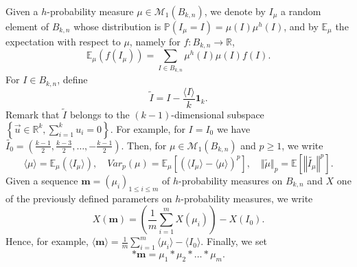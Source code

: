 \documentclass[10pt,11pt]{amsart}%
\begin{document}
 
Given a $h$-probability measure $\mu\in \mathcal{M}_{1}(B_{k,n})$, we denote by $I_{\mu}$ a random element of $B_{k,n}$ whose distribution is $\mathbb{P}(I_{\mu}=I)=\mu(I)\mu^h(I)$, and by $\mathbb{E}_{\mu}$ the expectation with respect to $\mu$, namely for $f:B_{k,n}\rightarrow \mathbb{R}$,
$$\mathbb{E}_{\mu}(f(I_{\mu}))=\sum_{I\in B_{k,n}}\mu^h(I)\mu(I)f(I).$$ 
For $I\in B_{k,n}$, define
$$\tilde{I}=I-\frac{\langle I\rangle}{k}\mathbf{1}_k.$$
Remark that $\tilde{I}$ belongs to the $(k-1)$-dimensional subspace $\left\{\vec{u}\in \mathbb{R}^k, \sum_{i=1}^k u_i=0\right\}$. For example, for $I=I_0$ we have $\widetilde{I_0}=\left(\frac{k-1}{2},\frac{k-3}{2},\ldots,-\frac{k-1}{2}\right)$. Then, for $\mu \in\mathcal{M}_1(B_{k,n})$ and $p\geq 1$, we write 
$$\langle\mu\rangle=\mathbb{E}_{\mu}(\langle I_\mu\rangle),\quad Var_p(\mu)=\mathbb{E}_{\mu}\left[\left(\langle I_{\mu}\rangle-\langle\mu\rangle\right)^p\right],\quad \Vert \tilde{\mu}\Vert_p=\mathbb{E}\left[\left\Vert \widetilde{I_{\mu}}\right\Vert^p\right].$$ 
Given a sequence $\mathbf{m}=(\mu_i)_{1\leq i\leq m}$ of $h$-probability measures on $B_{k,n}$ and $X$ one of the previously defined parameters on $h$-probability measures, we write 
$$X(\mathbf{m})=\left(\frac{1}{m}\sum_{i=1}^mX(\mu_i)\right)-X(I_0).$$ 
Hence, for example, $\langle\mathbf{m}\rangle=\frac{1}{m}\sum_{i=1}^m\langle\mu_i\rangle-\langle I_0\rangle$.
 Finally, we set 
\begin{equation}\label{eq:product_m_definition}
*\mathbf{m}=\mu_1*\mu_2*\dots*\mu_m.
\end{equation}
\end{document}
